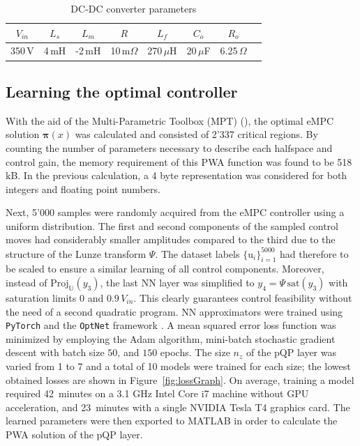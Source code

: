 \begin{table}[b]
	\begin{center}
		\caption{DC-DC converter parameters} \label{tab:param}
		\begin{tabular}{cccccccc}
			\hline 
			$V_{in}$ & $L_{s}$ & $L_{m}$ & $R$ & $L_f$ & $C_o$ & $R_o$ & \\\hline
			350$\,$V & 4$\,$mH & -2$\,$mH & 10$\,$m$\Omega$ & 270$\, \mu$H & 20$\, \mu$F & 6.25$\, \Omega$\\ \hline
		\end{tabular}
	\end{center}
\end{table}


\subsection{Learning the optimal controller}
With the aid of the Multi-Parametric Toolbox (MPT) (\cite{herceg2013multi}), the optimal eMPC solution $\bm{\pi}(x)$ was calculated and consisted of 2'337 critical regions. By counting the number of parameters necessary to describe each halfspace and control gain, the memory requirement of this PWA function was found to be 518$\,$kB. In the previous calculation, a 4 byte representation was considered for both integers and floating point numbers.

Next, 5'000 samples were randomly acquired from the eMPC controller using a uniform distribution. The first and second components of the sampled control moves had considerably smaller amplitudes compared to the third due to the structure of the Lunze transform $\Psi$. The dataset labels $\{\text{u}_i\}_{i=1}^{5000}$ had therefore to be scaled to ensure a similar learning of all control components. Moreover, instead of $\text{Proj}_{\mathbb{U}}(y_3)$, the last NN layer was simplified to $y_4 = \Psi \, \text{sat}(y_3)$ with saturation limits $0$ and $0.9 \, V_{in}$. This clearly guarantees control feasibility without the need of a second quadratic program. NN approximators were trained using \texttt{PyTorch} and the \texttt{OptNet} framework \citep{amos2017optnet}. A mean squared error loss function was minimized by employing the Adam algorithm, mini-batch stochastic gradient descent with batch size $50$, and $150$ epochs. The size $n_z$ of the pQP layer was varied from 1 to 7 and a total of 10 models were trained for each size; the lowest obtained losses are shown in Figure~\ref{fig:lossGraph}. On average, training a model required 42~minutes on a 3.1 GHz Intel Core i7 machine without GPU acceleration, and 23~minutes with a single NVIDIA Tesla T4 graphics card. The learned parameters were then exported to MATLAB in order to calculate the PWA solution of the pQP layer. 


